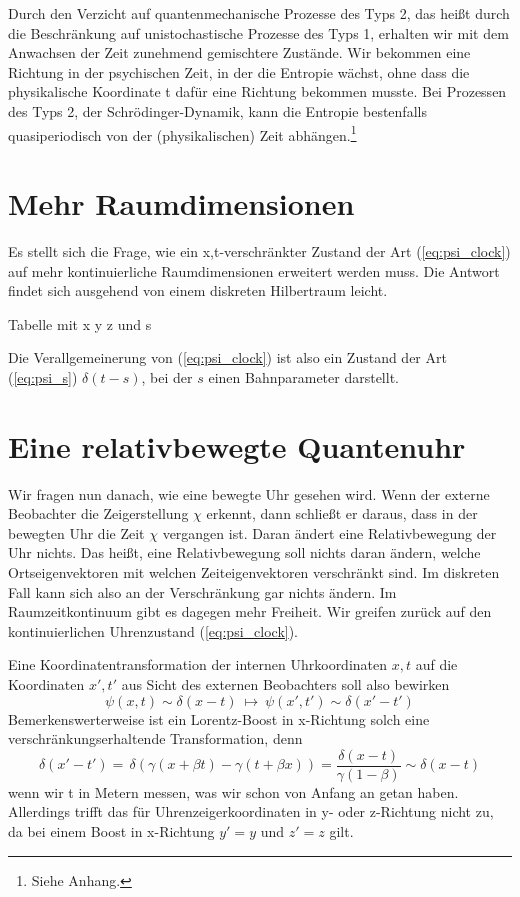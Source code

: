 \documentclass[12pt]{article}
\begin{document}
Durch den Verzicht auf quantenmechanische Prozesse des Typs 2, das heißt durch die Beschränkung auf unistochastische Prozesse des Typs 1, erhalten wir mit dem Anwachsen der Zeit zunehmend gemischtere Zustände. Wir bekommen eine Richtung in der psychischen Zeit, in der die Entropie wächst, ohne dass die physikalische Koordinate t dafür eine Richtung bekommen musste. Bei Prozessen des Typs 2, der Schrödinger-Dynamik, kann die Entropie bestenfalls quasiperiodisch von der (physikalischen) Zeit abhängen.\footnote{Siehe Anhang.}

\section{Mehr Raumdimensionen}

Es stellt sich die Frage, wie ein x,t-verschränkter Zustand der Art (\ref{eq:psi_clock}) auf mehr kontinuierliche Raumdimensionen erweitert werden muss. Die Antwort findet sich ausgehend von einem diskreten Hilbertraum leicht.

Tabelle mit x y z und s 

Die Verallgemeinerung von (\ref{eq:psi_clock}) ist also ein Zustand der Art (\ref{eq:psi_s}) $\delta(t-s)$, bei der $s$ einen Bahnparameter darstellt.

\section{Eine relativbewegte Quantenuhr}

Wir fragen nun danach, wie eine bewegte Uhr gesehen wird. Wenn der externe Beobachter die Zeigerstellung $\chi$ erkennt, dann schließt er daraus, dass in der bewegten Uhr die Zeit $\chi$ vergangen ist. Daran ändert eine Relativbewegung der Uhr nichts. Das heißt, eine Relativbewegung soll nichts daran ändern, welche Ortseigenvektoren mit welchen Zeiteigenvektoren verschränkt sind. Im diskreten Fall kann sich also an der Verschränkung gar nichts ändern. Im Raumzeitkontinuum gibt es dagegen mehr Freiheit. Wir greifen zurück auf den kontinuierlichen Uhrenzustand (\ref{eq:psi_clock}). 

Eine Koordinatentransformation der internen Uhrkoordinaten $x,t$ auf die Koordinaten $x',t'$ aus Sicht des externen Beobachters soll also bewirken
\begin{equation} 
\psi(x,t) \sim \delta(x-t)\ \longmapsto \ \psi(x',t') \sim \delta(x'-t')
\end{equation} 
Bemerkenswerterweise ist ein Lorentz-Boost in x-Richtung solch eine verschränkungserhaltende Transformation, denn
\begin{equation} 
\delta(x'-t') =\, \delta(\gamma (x + \beta t) - \gamma (t + \beta x)) 
= \frac{\delta(x-t)}{\gamma (1-\beta)} \sim \delta(x-t)
\end{equation}
wenn wir t in Metern messen, was wir schon von Anfang an getan haben. Allerdings trifft das für Uhrenzeigerkoordinaten in y- oder z-Richtung nicht zu, da bei einem Boost in x-Richtung $y'=y$ und $z'=z$ gilt.
\end{document}
